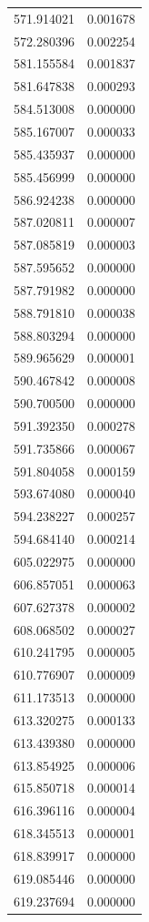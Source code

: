 \begin{longtable}{rr}
571.914021 & 0.001678 \\
572.280396 & 0.002254 \\
581.155584 & 0.001837 \\
581.647838 & 0.000293 \\
584.513008 & 0.000000 \\
585.167007 & 0.000033 \\
585.435937 & 0.000000 \\
585.456999 & 0.000000 \\
586.924238 & 0.000000 \\
587.020811 & 0.000007 \\
587.085819 & 0.000003 \\
587.595652 & 0.000000 \\
587.791982 & 0.000000 \\
588.791810 & 0.000038 \\
588.803294 & 0.000000 \\
589.965629 & 0.000001 \\
590.467842 & 0.000008 \\
590.700500 & 0.000000 \\
591.392350 & 0.000278 \\
591.735866 & 0.000067 \\
591.804058 & 0.000159 \\
593.674080 & 0.000040 \\
594.238227 & 0.000257 \\
594.684140 & 0.000214 \\
605.022975 & 0.000000 \\
606.857051 & 0.000063 \\
607.627378 & 0.000002 \\
608.068502 & 0.000027 \\
610.241795 & 0.000005 \\
610.776907 & 0.000009 \\
611.173513 & 0.000000 \\
613.320275 & 0.000133 \\
613.439380 & 0.000000 \\
613.854925 & 0.000006 \\
615.850718 & 0.000014 \\
616.396116 & 0.000004 \\
618.345513 & 0.000001 \\
618.839917 & 0.000000 \\
619.085446 & 0.000000 \\
619.237694 & 0.000000 \\

\end{longtable}
